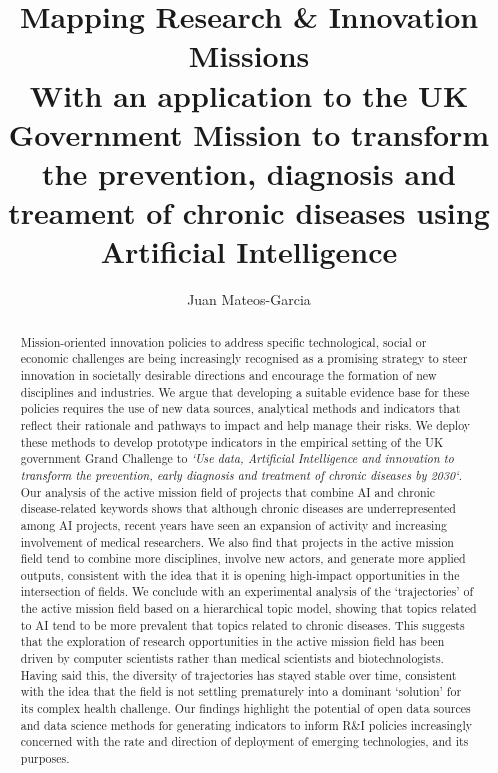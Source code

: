 \documentclass[11pt]{article}
\begin{document}
\title{%
\textbf{Mapping Research \& Innovation Missions \\
\large With an application to the UK Government Mission to transform the prevention, diagnosis and treament of chronic diseases using Artificial Intelligence}}
\author{Juan Mateos-Garcia}
\maketitle
\begin{abstract}
Mission-oriented innovation policies to address specific technological, social or economic challenges are being increasingly recognised as a promising strategy to steer innovation in societally desirable directions and encourage the formation of new disciplines and industries. We argue that developing a suitable evidence base for these policies requires the use of new data sources, analytical methods and indicators that reflect their rationale and pathways to impact and help manage their risks. We deploy these methods to develop prototype indicators in the empirical setting of the UK government Grand Challenge to \textit{`Use data, Artificial Intelligence and innovation to transform the prevention, early diagnosis and treatment of chronic diseases by 2030`}. Our analysis of the active mission field of projects that combine AI and chronic disease-related keywords shows that although chronic diseases are underrepresented among AI projects, recent years have seen an expansion of activity and increasing involvement of medical researchers.  We also find that projects in the active mission field tend to combine more disciplines, involve new actors, and generate more applied outputs, consistent with the idea that it is opening high-impact opportunities in the intersection of fields.  We conclude with an experimental analysis of the `trajectories' of the active mission field based on a hierarchical topic model, showing that topics related to AI tend to be more prevalent that topics related to chronic diseases. This suggests that the exploration of research opportunities in the active mission field has been driven by computer scientists rather than medical scientists and biotechnologists. Having said this, the diversity of trajectories has stayed stable over time, consistent with the idea that the field is not settling prematurely into a dominant `solution' for its complex health challenge. Our findings highlight the potential of open data sources and data science methods for generating indicators to inform R\&I policies increasingly concerned with the rate and direction of deployment of emerging technologies, and its purposes.
\end{abstract}
\end{document}
